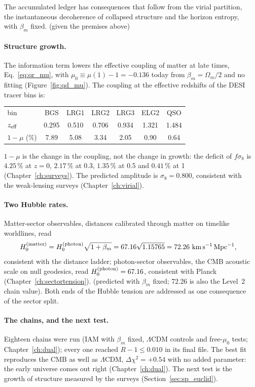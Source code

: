 The accumulated ledger has consequences that follow from the virial partition, the instantaneous decoherence of collapsed structure and the horizon
entropy, with $\beta_m$ fixed. \derived{} (given the premises above)

\paragraph{Structure growth.} The information term lowers the effective coupling of matter at late times, Eq.~\eqref{eq:qr_mu}, with
$\mu_0\equiv\mu(1)-1=-0.136$ today from $\beta_m=\Omega_m/2$ and no fitting (Figure~\ref{fig:qd_mu}). \derived{} The coupling at the effective redshifts
of the DESI tracer bins is:
\begin{center}\small\begin{tabular}{lcccccc}\toprule
bin & BGS & LRG1 & LRG2 & LRG3 & ELG2 & QSO\\ $z_{\rm eff}$ & 0.295 & 0.510 & 0.706 & 0.934 & 1.321 & 1.484\\\midrule
$1-\mu$ (\%) & 7.89 & 5.08 & 3.34 & 2.05 & 0.90 & 0.64\\\bottomrule
\end{tabular}\end{center}
\calc{} $1-\mu$ is the change in the coupling, not the change in growth: the deficit of $f\sigma_8$ is $4.25\,\%$ at $z=0$, $2.17\,\%$ at 0.3, $1.35\,\%$ at
0.5 and $0.41\,\%$ at 1 (Chapter~\ref{ch:surveys}). \calc{} The predicted amplitude is $\sigma_8=0.800$, consistent with the weak-lensing surveys
(Chapter~\ref{ch:virial}). \prediction

\paragraph{Two Hubble rates.} Matter-sector observables, distances calibrated through matter on timelike worldlines, read
\begin{equation}
H_0^{(\rm matter)}=H_0^{(\rm photon)}\sqrt{1+\beta_m}=67.16\sqrt{1.15765}=72.26\ {\rm km\,s^{-1}\,Mpc^{-1}},\label{eq:qr_H0}
\end{equation}
consistent with the distance ladder; photon-sector observables, the CMB acoustic scale on null geodesics, read $H_0^{(\rm photon)}=67.16$, consistent with
Planck (Chapter~\ref{ch:sectortension}). \calc{} (predicted with $\beta_m$ fixed; 72.26 is also the Level~2 chain value). Both ends of the Hubble tension
are addressed as one consequence of the sector split. \interp

\paragraph{The chains, and the next test.} Eighteen chains were run (IAM with $\beta_m$ fixed, $\Lambda$CDM controls and free-$\mu_0$ tests; Chapter~\ref{ch:dual}); every one reached $R-1\le0.010$ in its final file. The best fit
reproduces the CMB as well as $\Lambda$CDM, $\Delta\chi^2=+0.54$ with no added parameter: the early universe comes out right
(Chapter~\ref{ch:dual}). \measured{} The next test is the growth of structure measured by the surveys (Section~\ref{sec:sp_euclid}). \prediction


